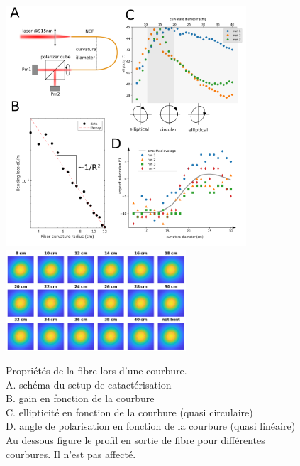 \begin{figure}
\centering
\includegraphics[width=0.8\textwidth]{./files/fiber_bending.png}
\includegraphics[width=0.6\textwidth]{./files/beam_profile.png}
\caption{Propriétés de la fibre lors d'une courbure.
\\ A. schéma du setup de catactérisation
\\ B. gain en fonction de la courbure
\\ C. ellipticité en fonction de la courbure (quasi circulaire)
\\ D. angle de polarisation en fonction de la courbure (quasi linéaire)
\\ Au dessous figure le profil en sortie de fibre pour différentes courbures. Il n'est pas affecté.
\label{FIGfibercarac}}
\end{figure}



